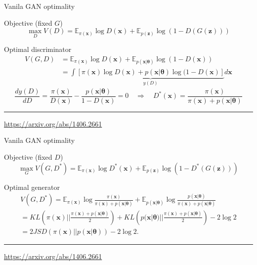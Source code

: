 \documentclass{beamer}
\newcommand{\bx}{\mathbf{x}}
\newcommand{\bz}{\mathbf{z}}
\newcommand{\bbE}{\mathbb{E}}
\newcommand{\btheta}{\boldsymbol{\theta}}
\begin{document}
\begin{frame}{Vanila GAN optimality}
	
	\begin{block}{Objective (fixed $G$)}
		\[
		\max_D V(D) = \bbE_{\pi(\bx)} \log D(\bx) + \bbE_{p(\bz)} \log (1 - D(G(\bz)))
		\]
	\end{block}
	\begin{block}{Optimal discriminator}
		\vspace{-0.5cm}
		\begin{align*}
			V(G, D) &= \bbE_{\pi(\bx)} \log D(\bx) + \bbE_{p(\bx | \btheta)} \log (1 - D(\bx)) \\
			&= \int \underbrace{\left[ \pi(\bx) \log D(\bx) + p(\bx | \btheta)\log (1 - D(\bx) \right]}_{y(D)} d \bx
		\end{align*}
		\[
			\frac{d y(D)}{d D} = \frac{\pi(\bx)}{D(\bx)} - \frac{p(\bx | \btheta)}{1 - D(\bx)} = 0 \quad \Rightarrow \quad D^*(\bx) = \frac{\pi(\bx)}{\pi(\bx) + p(\bx | \btheta)}
		\]
	\end{block}
	\vfill
	\hrule\medskip
	{\scriptsize \href{https://arxiv.org/abs/1406.2661}{https://arxiv.org/abs/1406.2661}}

\end{frame}
\begin{frame}{Vanila GAN optimality}
	
	\begin{block}{Objective (fixed $D$)}
		\[
		\max_G V(G, D^*) = \bbE_{\pi(\bx)} \log D^*(\bx) + \bbE_{p(\bz)} \log (1 - D^*(G(\bz)))
		\]
	\end{block}
	\begin{block}{Optimal generator}
		\vspace{-0.5cm}
		\begin{multline*}
			V(G, D^*) = \bbE_{\pi(\bx)} \log \frac{\pi(\bx)}{\pi(\bx) + p(\bx | \btheta)} + \bbE_{p(\bx | \btheta)} \log \frac{p(\bx | \btheta)}{\pi(\bx) + p(\bx | \btheta)} \\
			 = KL \left(\pi(\bx) || \frac{\pi(\bx) + p(\bx | \btheta)}{2}\right) + KL \left(p(\bx | \btheta) || \frac{\pi(\bx) + p(\bx | \btheta)}{2}\right) - 2\log 2 \\
			 = 2JSD(\pi(\bx) || p(\bx | \btheta)) - 2\log 2.
		\end{multline*}
	\end{block}
	\vfill
	\hrule\medskip
	{\scriptsize \href{https://arxiv.org/abs/1406.2661}{https://arxiv.org/abs/1406.2661}}
	
\end{frame}
\end{document}

